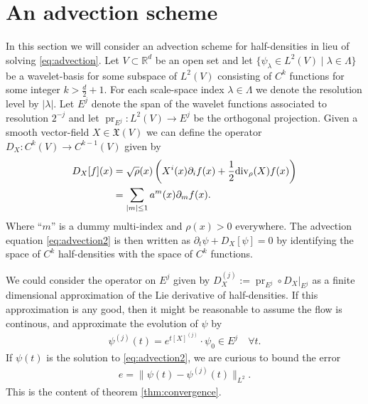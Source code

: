 \documentclass[letterpaper, 10 pt, conference]{ieeeconf}
\DeclareMathOperator{\pr}{pr}
\begin{document}


\section{An advection scheme}
\label{sec:scheme}
  In this section we will consider an advection scheme
  for half-densities in lieu of solving \eqref{eq:advection}.
  Let $V \subset \mathbb{R}^d$ be an open set and let
  $\{ \psi_\lambda \in L^2(V)  \mid \lambda \in \Lambda\}$
  be a wavelet-basis for some
  subspace of $L^2(V)$ consisting of $C^k$ functions for some
  integer $k > \frac{d}{2} + 1$.
  For each scale-space index $\lambda \in \Lambda$
  we denote the resolution level by $|\lambda|$.
  Let $E^j$ denote the span of the wavelet functions
  associated to resolution $2^{-j}$ and let 
  $\pr_{E^j}: L^2(V) \to E^j$ be the orthogonal projection.
  Given a smooth vector-field $X \in \mathfrak{X}(V)$
  we can define the operator $D_X : C^k(V) \to C^{k-1}(V)$ 
  given by
  \begin{align*}
    D_X[f](x) &=  \sqrt{\rho}(x) \left(  X^i (x) \partial_if(x) 
      + \frac{1}{2} {\rm div}_{\rho}(X) f(x) \right)\\
    &= \sum_{ | m | \leq 1 } a^m(x) \partial_{m}f(x).
  \end{align*}
  Where ``$m$'' is a dummy multi-index and $\rho(x) > 0$ everywhere.
  The advection equation \eqref{eq:advection2} is then written
  as $\partial_t \psi + D_X[\psi] = 0$ by identifying the space
  of $C^k$ half-densities with the space of $C^k$ functions.

  We could consider the operator on $E^j$ given by 
  $D_X^{(j)} := \pr_{E^j} \circ \left. D_X \right|_{E^j}$
  as a finite dimensional approximation of the Lie derivative of half-densities.
  If this approximation is any good, then it might be reasonable to assume
  the flow is continous, and approximate the evolution of $\psi$ by
  \begin{align*}
    \psi^{(j)}(t) = e^{t [X]^{(j)} } \cdot \psi_0 \in E^j \quad \forall t.
  \end{align*}
  If $\psi(t)$ is the solution to \eqref{eq:advection2},
  we are curious to bound the error
  \begin{align*}
    e = \| \psi(t) - \psi^{(j)}(t) \|_{L^2}.
  \end{align*}
  This is the content of theorem \ref{thm:convergence}.
\end{document}
